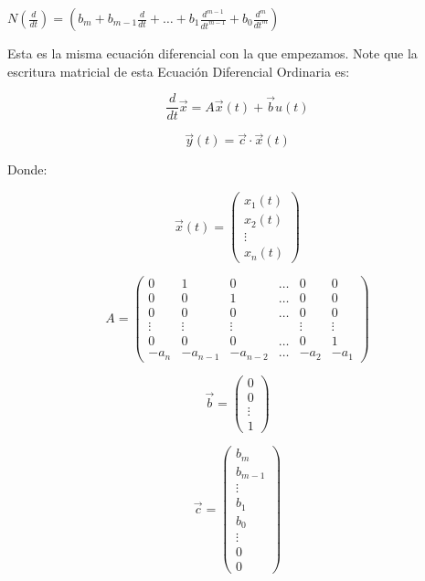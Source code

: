 \begin{math}
N \left( \frac{d}{dt} \right) = \left( b_m + b_{m-1} \frac{d}{dt} + \dots + b_1 \frac{d^{m-1}}{dt^{m-1}} + b_0 \frac{d^m}{dt^m} \right)
\end{math}

Esta es la misma ecuación diferencial con la que empezamos. Note que la escritura matricial de esta Ecuación Diferencial Ordinaria es:

\begin{equation}
\frac{d}{dt} \vec{x} = A \vec{x}(t) + \vec{b} u(t)
\end{equation}

\begin{equation}
\vec{y}(t) = \vec{c} \cdot \vec{x}(t)
\end{equation}

Donde:

\begin{equation}
\vec{x}(t) =
\begin{pmatrix}
x_1(t) \\
x_2(t) \\
\vdots \\
x_n(t)
\end{pmatrix}
\end{equation}

\begin{equation}
A =
\begin{pmatrix}
0 & 1 & 0 & \dots & 0 & 0 \\
0 & 0 & 1 & \dots & 0 & 0 \\
0 & 0 & 0 & \dots & 0 & 0 \\
\vdots & \vdots & \vdots &   & \vdots & \vdots \\
0 & 0 & 0 & \dots & 0 & 1 \\
-a_n & -a_{n-1} & -a_{n-2} & \dots & -a_2 & -a_1
\end{pmatrix}
\end{equation}

\begin{equation}
\vec{b} =
\begin{pmatrix}
0 \\
0 \\
\vdots \\
1
\end{pmatrix}
\end{equation}

\begin{equation}
\vec{c} =
\begin{pmatrix}
b_m     \\
b_{m-1} \\
\vdots  \\
b_1     \\
b_0     \\
\vdots  \\
0       \\
0
\end{pmatrix}
\end{equation}

